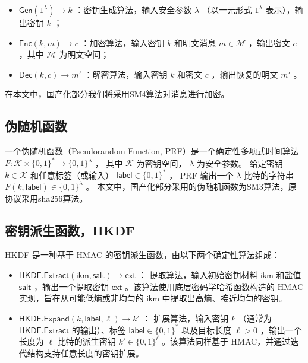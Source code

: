 \begin{itemize}
    \item  $ \mathsf{Gen}(1^\lambda) \rightarrow k $ ：密钥生成算法，输入安全参数  $ \lambda $ （以一元形式  $ 1^\lambda $  表示），输出密钥  $ k $ ；
    
    \item  $ \mathsf{Enc}(k, m) \rightarrow c $ ：加密算法，输入密钥  $ k $  和明文消息  $ m \in \mathcal{M} $ ，输出密文  $ c $ ，其中  $ \mathcal{M} $  为明文空间；
    
    \item  $ \mathsf{Dec}(k, c) \rightarrow m' $ ：解密算法，输入密钥  $ k $  和密文  $ c $ ，输出恢复的明文  $ m' $ 。
\end{itemize}

在本文中，国产化部分我们将采用SM4算法对消息进行加密。

\subsection{伪随机函数}
一个伪随机函数（Pseudorandom Function, PRF）是一个确定性多项式时间算法  
 $ F : \mathcal{K} \times \{0,1\}^* \to \{0,1\}^\lambda $ ，  
其中  $ \mathcal{K} $  为密钥空间， $ \lambda $  为安全参数。  
给定密钥  $ k \in \mathcal{K} $  和任意标签（或输入） $ \mathsf{label} \in \{0,1\}^* $ ，  
PRF 输出一个  $ \lambda $  比特的字符串  $ F(k, \mathsf{label}) \in \{0,1\}^\lambda $ 。
本文中，国产化部分采用的伪随机函数为SM3算法，原协议采用sha256算法。

\subsection{密钥派生函数，HKDF}
HKDF 是一种基于 HMAC 的密钥派生函数，由以下两个确定性算法组成：

\begin{itemize}
    \item  $ \mathsf{HKDF}.\mathsf{Extract}(\mathsf{ikm}, \mathsf{salt}) \rightarrow \mathsf{ext} $ ：  
    提取算法，输入初始密钥材料  $ \mathsf{ikm} $  和盐值  $ \mathsf{salt} $ ，输出一个提取密钥  $ \mathsf{ext} $ 。该算法使用底层密码学哈希函数构造的 HMAC 实现，旨在从可能低熵或非均匀的  $ \mathsf{ikm} $  中提取出高熵、接近均匀的密钥。

    \item  $ \mathsf{HKDF}.\mathsf{Expand}(k, \mathsf{label}, \ell) \rightarrow k' $ ：  
    扩展算法，输入密钥  $ k $ （通常为  $ \mathsf{HKDF}.\mathsf{Extract} $  的输出）、标签  $ \mathsf{label} \in \{0,1\}^* $  以及目标长度  $ \ell > 0 $ ，输出一个长度为  $ \ell $  比特的派生密钥  $ k' \in \{0,1\}^\ell $ 。该算法同样基于 HMAC，并通过迭代结构支持任意长度的密钥扩展。
\end{itemize}

